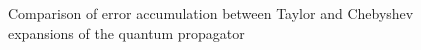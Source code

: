 \documentclass{beamer}
\begin{document}
\begin{frame}
\begin{columns}
\begin{column}{0.5\textwidth}
\begin{figure}
\caption{\footnotesize Comparison of error accumulation between Taylor and Chebyshev expansions of the quantum propagator}
\end{figure}
\end{column}
\end{columns}
\vspace{-1cm}
\end{frame}
\end{document}

